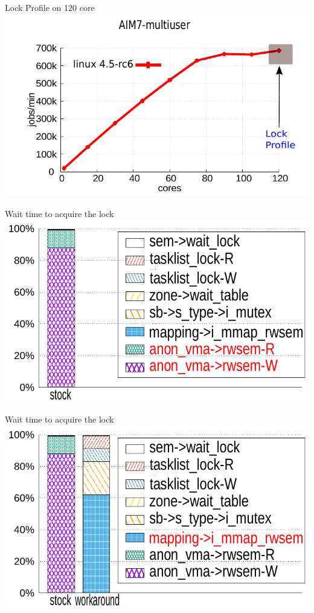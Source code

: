 \documentclass[english]{beamer} %
\begin{document}
\begin{frame}{Lock Profile on 120 core}
\includegraphics[scale=0.8]{graph/aim7_default_4}
\end{frame}


\begin{frame}{Wait time to acquire the lock}
\includegraphics[scale=0.8]{fig/lockstat}
\end{frame}

\begin{frame}{Wait time to acquire the lock}
\includegraphics[scale=0.8]{fig/lockstat2}
\end{frame}
\end{document}
